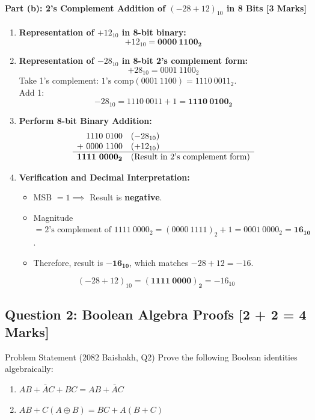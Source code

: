 \documentclass[11pt,a4paper,oneside]{book}
\begin{document}
\paragraph{Part (b): 2's Complement Addition of $(-28 + 12)_{10}$ in 8 Bits [3 Marks]}
\begin{enumerate}
  \item \textbf{Representation of $+12_{10}$ in 8-bit binary:}
  \[
  +12_{10} = \mathbf{0000\ 1100_2}
  \]
  \item \textbf{Representation of $-28_{10}$ in 8-bit 2's complement form:}
  \[
  +28_{10} = 0001\ 1100_2
  \]
  Take 1's complement: $\text{1's comp}(0001\ 1100) = 1110\ 0011_2$. \\
  Add 1:
  \[
  -28_{10} = 1110\ 0011 + 1 = \mathbf{1110\ 0100_2}
  \]
  \item \textbf{Perform 8-bit Binary Addition:}
  \[
  \begin{array}{r@{\quad}l}
    1110\ 0100 & (-28_{10}) \\
  +\ 0000\ 1100 & (+12_{10}) \\
  \hline
    \mathbf{1111\ 0000_2} & \text{(Result in 2's complement form)}
  \end{array}
  \]
  \item \textbf{Verification and Decimal Interpretation:}
  \begin{itemize}
    \item MSB $= 1 \implies$ Result is \textbf{negative}.
    \item Magnitude $= \text{2's complement of } 1111\ 0000_2 = (0000\ 1111)_2 + 1 = 0001\ 0000_2 = \mathbf{16_{10}}$.
    \item Therefore, result is $\mathbf{-16_{10}}$, which matches $-28 + 12 = -16$.
  \end{itemize}
\end{enumerate}

\begin{answerbox}
$$(-28 + 12)_{10} = \mathbf{(1111\ 0000)_2} = -16_{10}$$
\end{answerbox}

\vspace{0.6cm}

\subsection{Question 2: Boolean Algebra Proofs [2 + 2 = 4 Marks]}
\begin{questionbox}{Problem Statement (2082 Baishakh, Q2)}
Prove the following Boolean identities algebraically:
\begin{enumerate}[label=(\alph*)]
  \item $AB + \bar{A}C + BC = AB + \bar{A}C$
  \item $AB + C(A \oplus B) = BC + A(B+C)$
\end{enumerate}
\end{questionbox}
\end{document}
